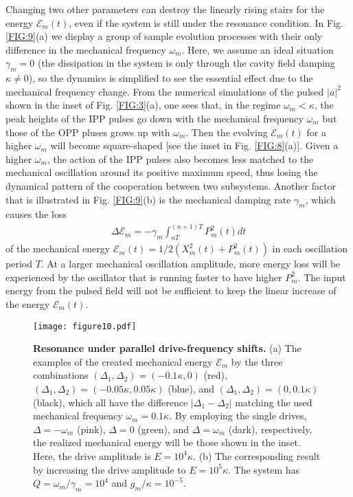 \documentclass[a4paper,fleqn]{cas-dc}
\begin{document}
Changing two other parameters can destroy the linearly rising stairs for the energy $\mathcal{E}_m(t)$, even if the system is still under the resonance condition. 
In Fig. \ref{FIG:9}(a) we display a group of sample evolution processes with their only difference in 
the mechanical frequency $\omega_m$. Here, we assume an ideal situation $\gamma_m=0$ (the dissipation 
in the system is only through the cavity field damping $\kappa\neq 0$), so the dynamics is simplified to 
see the essential effect due to the mechanical frequency change. From the numerical simulations of the pulsed 
$|a|^2$ shown in the inset of Fig. \ref{FIG:3}(a), one sees that, in the regime $\omega_m<\kappa$, the peak heights of the IPP pulses go down with the mechanical frequency $\omega_m$ but those of the OPP pluses grows up with $\omega_m$. Then the evolving $\mathcal{E}_m(t)$ for a higher $\omega_m$ will become square-shaped [see the inset in Fig. \ref{FIG:8}(a)]. Given a higher $\omega_m$, the action of the IPP pulses also becomes less matched to the mechanical oscillation around its positive maximum speed, thus losing the dynamical pattern of the cooperation between two subsystems. Another factor that is illustrated in Fig. \ref{FIG:9}(b) is the mechanical damping rate $\gamma_m$, which causes the loss 
\begin{eqnarray}
\Delta\mathcal{E}_m=-\gamma_m\int_{nT}^{(n+1)T} P_m^2(t)dt
\end{eqnarray}
of the mechanical energy
$\mathcal{E}_m(t)=1/2\left(X_m^2(t)+P_m^2(t)\right)$ in each oscillation period $T$. At a larger mechanical oscillation amplitude, more energy loss will be experienced by the oscillator that is running faster to have higher $P^2_m$. The input energy from the pulsed field will not be sufficient to keep the linear increase of the energy $\mathcal{E}_m(t)$. 

\begin{figure}
	\centering
		\texttt{[image: figure10.pdf]}
	\caption{{\bf Resonance under parallel drive-frequency shifts.} (a) The examples of the created mechanical energy $\mathcal{E}_m$ by the three combinations $(\Delta_1,\Delta_2)=(-0.1\kappa,0)$ (red), $(\Delta_1,\Delta_2)=(-0.05\kappa,0.05\kappa)$ (blue), and $(\Delta_1,\Delta_2)=(0,0.1\kappa)$ (black), which all have the difference $|\Delta_1-\Delta_2|$ matching the used mechanical frequency $\omega_m=0.1\kappa$. By employing the single drives, $\Delta=-\omega_m$ (pink), $\Delta=0$ (green), and $\Delta=\omega_m$ (dark), respectively, the realized mechanical energy will be those shown in the inset. Here, the drive amplitude is $E=10^4\kappa$. (b) The corresponding result by increasing the drive amplitude to $E=10^5\kappa$. The system has $Q=\omega_m/\gamma_m=10^4$ and $g_m/\kappa=10^{-5}$. }
	\label{FIG:10}
\end{figure}
\end{document}
